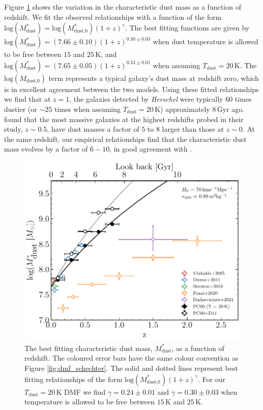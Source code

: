 Figure \ref{fig:dmf_m_evolution} shows the variation in the characteristic dust mass as a function of redshift. We fit the observed relationships with a function of the form $\textrm{log}(M_{\textrm{dust}}^*) = \textrm{log}(M_{\textrm{dust,0}}^*)(1+z)^\gamma$. The best fitting functions are given by $\textrm{log}(M_{\textrm{dust}}^*) = (7.66\pm0.10)(1+z)^{0.30\pm0.03}$ when dust temperature is allowed to be free between $15$ and $25\,$K, and $\textrm{log}(M_{\textrm{dust}}^*) = (7.65\pm0.05)(1+z)^{0.24\pm0.01}$ when assuming $T_{\textrm{dust}} = 20\,$K. The $\textrm{log}(M_{\textrm{dust,0}})$ term represents a typical galaxy's dust mass at redshift zero, which is in excellent agreement between the two models. Using these fitted relationships we find that at $z = 1$, the galaxies detected by \textit{Herschel} were typically $60$ times dustier (or $\sim 25$ times when assuming $T_{\textrm{dust}} = 20\,$K) approximately $8\,$Gyr ago. \citealt{Dunne_2011} found that the most massive galaxies at the highest redshifts probed in their study, $z \sim 0.5$, have dust masses a factor of $5$ to $8$ larger than those at $z \sim 0$. At the same redshift, our empirical relationships find that the characteristic dust mass evolves by a factor of $6 - 10$, in good agreement with \citealt{Dunne_2011}.

\begin{figure}
	\centering
	\includegraphics[width=0.8\columnwidth]{Figures/dmf_m_evolution.pdf}
	\caption[Evolution of the characteristic dust mass, $M_\textrm{dust}^*$, as a function of redshift]{The best fitting characteristic dust mass, $M_\textrm{dust}^*$, as a function of redshift. The coloured error bars have the same colour convention as Figure \ref{fig:dmf_schechter}. The solid and dotted lines represent best fitting relationships of the form $\textrm{log}(M_{\textrm{dust,0}}^*)(1+z)^\gamma$. For our $T_{\textrm{dust}} = 20\,$K DMF we find $\gamma = 0.24\pm0.01$ and $\gamma = 0.30\pm0.03$ when temperature is allowed to be free between $15\,$K and $25\,$K.}
	\label{fig:dmf_m_evolution}
\end{figure}

